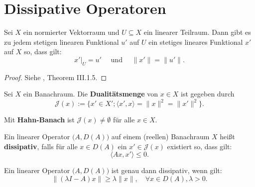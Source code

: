 \newpage 
\section{Dissipative Operatoren}


\begin{satz}\label{Hahn-Banach}
Sei $X$ ein normierter Vektorraum und $U\subseteq X$ ein linearer Teilraum. Dann gibt es zu jedem stetigen linearen Funktional $u'$ auf $U$ ein stetiges lineares Funktional $x'$ auf $X$ so, dass gilt:
\begin{equation*}
x'|_U = u'\quad\text{ und }\quad \|x'\|=\|u'\|.
\end{equation*}
\end{satz}

\begin{proof}
Siehe  \cite{werner_2007}, Theorem III.1.5.
\end{proof}



\begin{defi}
Sei $X$ ein Banachraum. Die \textbf{Dualitätsmenge} von $x\in X$ ist gegeben durch
\begin{equation*}
\mathcal J(x):=\{x'\in X'; \langle x', x\rangle=\|x\|^2 = \|x'\|^2\}.%
\end{equation*}
\end{defi}

\begin{bem}
Mit  \textbf{Hahn-Banach} ist $\mathcal J(x)\neq \emptyset$ für alle $x\in X$.
\end{bem}

\begin{defi}
Ein linearer Operator $\big(A, D(A)\big)$ auf einem (reellen) Banachraum $X$ heißt \textbf{dissipativ}, falls für alle $x\in D(A)$ ein $x'\in \mathcal J(x)$ existiert so, dass gilt:
\begin{equation*}
\langle Ax, x'\rangle \leq 0.
\end{equation*}
\end{defi}

\begin{prop}\label{Charakterisierung Dissipativer Operatoren}
Ein linearer Operator $\big(A, D(A)\big)$ ist genau dann dissipativ, wenn gilt:
\begin{equation*}
    \|(\lambda I- A)x\|\geq \lambda \|x\|,\quad \forall x\in D(A), \mathfrak \lambda >0.
\end{equation*}
\end{prop} 

